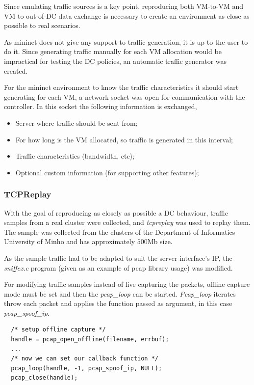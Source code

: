 \documentclass[12pt,english,oneside]{book}
\begin{document}
Since emulating traffic sources is a key point, reproducing both VM-to-VM and VM to out-of-DC data exchange is necessary to create an environment as close as possible to real scenarios.

As mininet does not give any support to traffic generation, it is up to the user to do it. Since generating traffic manually for each VM allocation would be impractical for testing the DC policies, an automatic traffic generator was created.

For the mininet environment to know the traffic characteristics it should start generating for each VM, a network socket was open for communication with the controller.
In this socket the following information is exchanged,
\begin{itemize}
  \item Server where traffic should be sent from;
  \item For how long is the VM allocated, so traffic is generated in this interval;
  \item Traffic characteristics (bandwidth, etc);
  \item Optional custom information (for supporting other features);
\end{itemize}

\subsubsection{TCPReplay}
\hspace{0.6cm}

With the goal of reproducing as closely as possible a DC behaviour, traffic samples from a real cluster were collected, and \textit{tcpreplay}\cite{tcprep} was used to replay them. The sample was collected from the clusters of the Department of Informatics - University of Minho and has approximately $500$Mb size.

As the sample traffic had to be adapted to suit the server interface's IP, the \textit{sniffex.c}\cite{sniffex} program (given as an example of pcap library usage) was modified.

For modifying traffic samples instead of live capturing the packets, offline capture mode must be set and then the \textit{pcap\_loop} can be started. \textit{Pcap\_loop} iterates throw each packet and applies the function passed as argument, in this case \textit{pcap\_spoof\_ip}.

\lstset{language=C,frame=lines}
\begin{lstlisting}
  /* setup offline capture */
  handle = pcap_open_offline(filename, errbuf);
  ...
  /* now we can set our callback function */
  pcap_loop(handle, -1, pcap_spoof_ip, NULL);
  pcap_close(handle);
\end{lstlisting}
\end{document}
